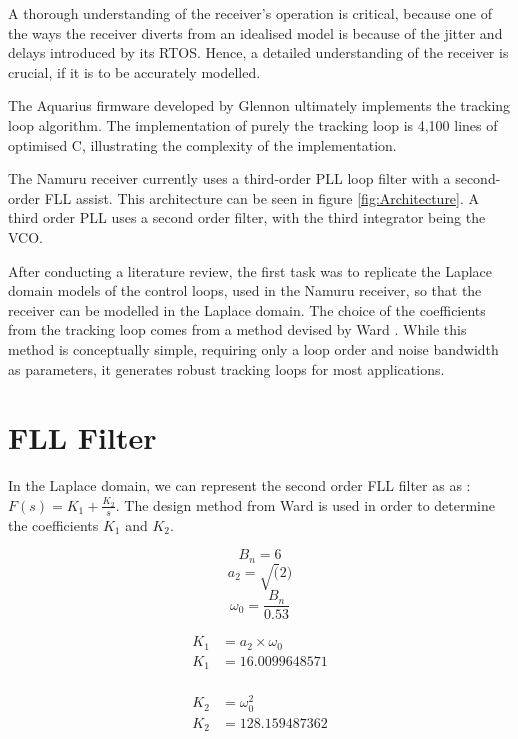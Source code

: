 A thorough understanding of the receiver's operation is critical, because one of the ways the receiver diverts from an idealised model is because of the jitter and delays introduced by its \ac{RTOS}. Hence, a detailed understanding of the receiver is crucial, if it is to be accurately modelled. 

The Aquarius firmware developed by Glennon \cite{Glennon11aquariusfirmware} ultimately implements the tracking loop algorithm. The implementation of purely the tracking loop is 4,100 lines of optimised C, illustrating the complexity of the implementation.

The Namuru receiver currently uses a third-order \ac{PLL} loop filter with a second-order \ac{FLL} assist. This architecture can be seen in figure \ref{fig:Architecture}.  A third order \ac{PLL} uses a second order filter, with the third integrator being the \ac{VCO}.

After conducting a literature review, the first task was to replicate the Laplace domain models of the control loops, used in the Namuru receiver, so that the receiver can be modelled in the Laplace domain. The choice of the coefficients from the tracking loop comes from a method devised by Ward \cite{Ward}. While this method is conceptually simple, requiring only a loop order and noise bandwidth as parameters, it generates robust tracking loops for most applications. 

\section{\ac{FLL} Filter}
In the Laplace domain, we can represent the second order \ac{FLL} filter as as :  $F(s) = K_1 + \frac{K_2}{s}$. The design method from Ward \cite{Ward} is used in order to determine the coefficients $K_1$ and $K_2$.  

$$B_n = 6$$
$$a_2 = \sqrt(2)$$
$$\omega_{0}=\frac{B_n}{0.53}$$

\begin{equation} \label{eq1}
\begin{split}
K_1 & = a_2 \times \omega_{0}\\
K_1 & = 16.0099648571\\
\end{split}
\end{equation}

\begin{equation} \label{eq2}
\begin{split}
K_2 & = \omega_{0}^2\\
K_2 & = 128.159487362\\
\end{split}
\end{equation}


